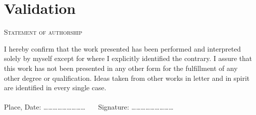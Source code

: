 \documentclass[a4paper,captions=tableheading,12pt]{scrartcl}
\begin{document}
	\section{Validation} \label{sec:validation}
	
	
	\pagebreak
	\printbibliography[title={References}]
	
%	
%	
	
	\clearpage 
	\begin{center}
		\textsc{Statement of authorship}
	\end{center}
	I  hereby confirm that the  work  presented  has  been  performed  and interpreted solely by myself except for where I explicitly identified the contrary. I assure  that  this  work  has not been presented in  any  other form  for  the  fulfillment  of  any  other  degree  or  qualification.  Ideas taken  from  other  works in  letter and  in  spirit are identified in every single case.
	\\ \\
	Place, Date: \dots\dots \dots \dots \dots \dots \dots \dots \dots ~~~ Signature: \dots \dots \dots \dots \dots \dots \dots \dots \dots
\end{document}
